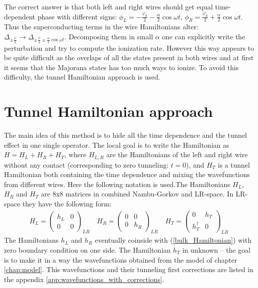 The correct answer is that both left and right wires should get equal time-dependent phase with different signs: $ \phi_L=-\frac{\varphi_0}{2}-\frac{\alpha}{2}\cos \omega t $, $ \phi_R=\frac{\varphi_0}{2}+\frac{\alpha}{2}\cos \omega t $. Thus the superconducting terms in the wire Hamiltonians alter: $ \Delta_{\pm\frac{\varphi}{2}} \to\Delta_{\pm\frac{\varphi}{2}\pm \frac{\alpha}{2}\cos \omega t} $. Decomposing them in small $ \alpha $ one can explicitly write the perturbation and try to compute the ionization rate. However this way appears to be quite difficult as the overlaps of all the states 
present in both wires and at first it seems that the Majorana states has too much ways to ionize. To avoid this difficulty, the tunnel Hamiltonian approach is used.

\section{Tunnel Hamiltonian approach}
\label{sec:tunnel_hamiltonian}
The main idea of this method is to hide all the time dependence and the tunnel effect in one single operator. The local goal is to write the Hamiltonian as $ H=H_L+H_R+H_T $, where $ H_{L,R} $ are the Hamiltonians of the left and right wire without any contact (corresponding to zero tunneling: $ t=0 $), and $H_T  $ is a tunnel Hamiltonian both containing the time dependence and mixing the wavefunctions from different wires. 
Here the following notation is used.The Hamiltonians $ H_L $, $ H_R $ and $ H_T $ are 8x8 matrices in combined Nambu-Gorkov and LR-space. In LR-space they have the following form:
\begin{gather}
	H_L
	=
	\begin{pmatrix}
	h_L & 0 \\
	0 & 0
	\end{pmatrix}_{LR}
	\quad
	H_R
=
\begin{pmatrix}
0 & 0 \\
0 & h_R
\end{pmatrix}_{LR}
\quad
	H_T
=
\begin{pmatrix}
0 & h_T \\
h_T^\dagger & 0
\end{pmatrix}_{LR}	
\end{gather}
The Hamiltonians $ h_L $ and $ h_R $ eventually coinside with (\ref{bulk_Hamiltonian}) with zero boundary condition on one side. The Hamiltonian $ h_T $ in unknown -- the goal is to make it in a way the wavefunctions obtained from the model of chapter \ref{chap:model}. This wavefunctions and their tunneling first corrections are listed in the appendix \ref{app:wavefunctions_with_corrections}.

